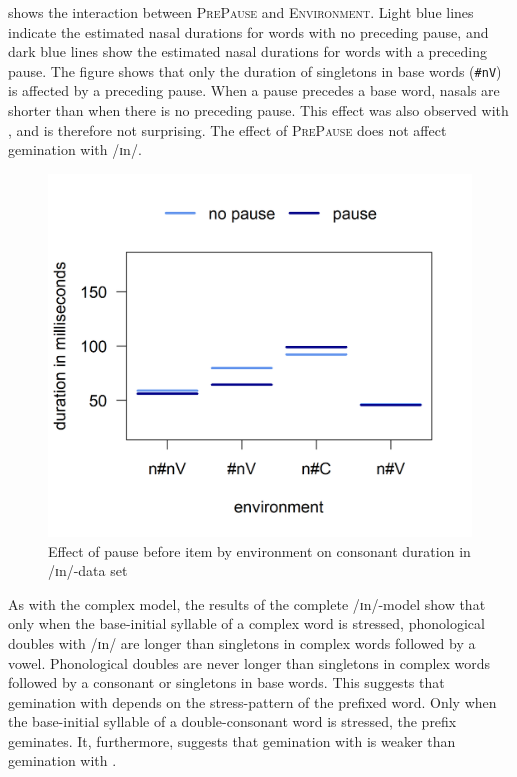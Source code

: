 
 shows the interaction between \textsc{PrePause} and \textsc{Environment}. Light blue lines indicate the estimated nasal durations for words with no preceding pause, and dark blue lines show the estimated nasal durations for words with a preceding pause.
The figure shows that only the duration of singletons in base words (\texttt{\#nV}) is affected by a preceding pause. When a pause precedes a base word, nasals are shorter than when there is no preceding pause. This effect was also observed with , and is therefore not surprising. 
The effect of \textsc{PrePause} does not affect gemination with /ɪn/.



\begin{figure}[h!]
	\vspace*{-0.4cm}
	\centering
	
	\includegraphics [scale=0.5] {images/Experiment/InModelCompleteInterEnvPause}
	\caption{Effect of pause before item by environment on consonant duration in /ɪn/-data set}
	\label{fig:Env Pause In complete experiment}
\end{figure}	




As with the complex model, the results of the complete /ɪn/-model show that only when the base-initial syllable of a complex word is stressed, phonological doubles with /ɪn/ are longer than singletons in complex words followed by a vowel. 
Phonological doubles are never longer than singletons in complex words followed by a consonant or singletons in base words. 
This suggests that gemination with  depends on the stress-pattern of the prefixed word.  Only when the base-initial syllable of a double-consonant word is stressed, the prefix geminates. It, furthermore, suggests that gemination with  is weaker than gemination with .


